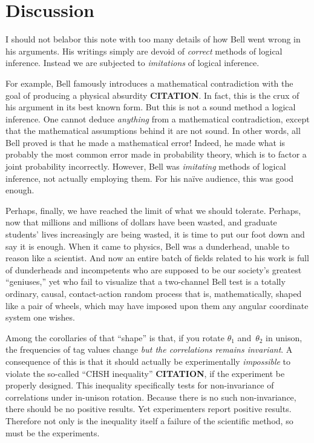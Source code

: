 \documentclass[9pt,technote]{IEEEtran}
\begin{document}
\section{Discussion}

I should not belabor this note with too many details of how Bell went
wrong in his arguments. His writings simply are devoid of
{\em{correct}} methods of logical inference. Instead we are subjected
to {\em{imitations}} of logical inference.

For example, Bell famously introduces a mathematical contradiction
with the goal of producing a physical absurdity {\bf{CITATION}}. In
fact, this is the crux of his argument in its best known form. But
this is not a sound method a logical inference. One cannot deduce
{\em{anything}} from a mathematical contradiction, except that the
mathematical assumptions behind it are not sound. In other words, all
Bell proved is that he made a mathematical error! Indeed, he made what
is probably the most common error made in probability theory, which is
to factor a joint probability incorrectly. However, Bell was
{\em{imitating}} methods of logical inference, not actually employing
them. For his naïve audience, this was good enough.

Perhaps, finally, we have reached the limit of what we should
tolerate. Perhaps, now that millions and millions of dollars have been
wasted, and graduate students' lives increasingly are being wasted, it
is time to put our foot down and say it is enough. When it came to
physics, Bell was a dunderhead, unable to reason like a scientist. And
now an entire batch of fields related to his work is full of
dunderheads and incompetents who are supposed to be our society’s
greatest ``geniuses,'' yet who fail to visualize that a two-channel
Bell test is a totally ordinary, causal, contact-action random process
that is, mathematically, shaped like a pair of wheels, which may have
imposed upon them any angular coordinate system one wishes.

Among the corollaries of that ``shape'' is that, if you rotate
$\theta_1$ and~$\theta_2$ in unison, the frequencies of tag values
change {\em{but the correlations remains invariant}}. A consequence of
this is that it should actually be experimentally {\em{impossible}} to
violate the so-called ``CHSH inequality'' {\bf{CITATION}}, if the
experiment be properly designed. This inequality specifically tests
for non-invariance of correlations under in-unison rotation. Because
there is no such non-invariance, there should be no positive
results. Yet experimenters report positive results. Therefore not only
is the inequality itself a failure of the scientific method, so must
be the experiments.
\end{document}
